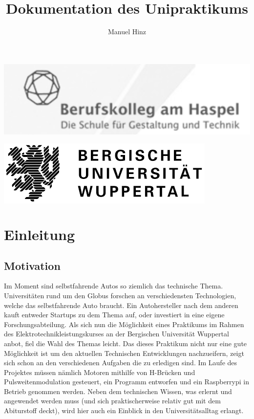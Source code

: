 \documentclass[notitlepage]{report}
\author{Manuel Hinz}
\title{Dokumentation des Unipraktikums}
\begin{document}
\maketitle
\includegraphics[scale=1]{BKAH.png}


\includegraphics[scale=0.75]{Uni.png}

\tableofcontents
\newpage

\chapter{Einleitung}

\section{Motivation}
Im Moment sind selbstfahrende Autos so ziemlich das technische Thema. Universit\"{a}ten rund um den Globus forschen an verschiedensten Technologien, welche das selbstfahrende Auto braucht. Ein Autohersteller nach dem anderen kauft entweder Startups zu dem Thema auf, oder investiert in eine eigene Forschungsabteilung. Als sich nun die M\"{o}glichkeit eines Praktikums im Rahmen des Elektrotechnikleistungskurses an der Bergischen Universit\"{a}t Wuppertal anbot, fiel die Wahl des Themas leicht. Das dieses Praktikum nicht nur eine gute M\"{o}glichkeit ist um den aktuellen Technischen Entwicklungen nachzueifern, zeigt sich schon an den verschiedenen Aufgaben die zu erledigen sind. Im Laufe des Projektes m\"{u}ssen n\"{a}mlich Motoren mithilfe von H-Br\"{u}cken und Pulsweitenmodulation gesteuert, ein Programm entworfen und ein Raspberrypi in Betrieb genommen werden. Neben dem technischen Wissen, was erlernt und angewendet werden muss (und sich praktischerweise relativ gut mit dem Abiturstoff deckt), wird hier auch ein Einblick in den Universit\"{a}tsalltag erlangt.  
\end{document}
